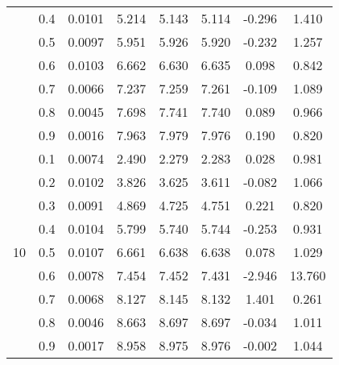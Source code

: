 \documentclass[11pt,a4paper]{report}
\begin{document}
\begin{longtable}{ | c | c || c | c | c | c | c | c | }
 & 0.4 & 0.0101 & 5.214 & 5.143 & 5.114 & -0.296 & 1.410 \\
 & 0.5 & 0.0097 & 5.951 & 5.926 & 5.920 & -0.232 & 1.257 \\
 & 0.6 & 0.0103 & 6.662 & 6.630 & 6.635 & 0.098 & 0.842 \\
 & 0.7 & 0.0066 & 7.237 & 7.259 & 7.261 & -0.109 & 1.089 \\
 & 0.8 & 0.0045 & 7.698 & 7.741 & 7.740 & 0.089 & 0.966 \\
 & 0.9 & 0.0016 & 7.963 & 7.979 & 7.976 & 0.190 & 0.820 \\
 \hline
\multirow{9}{*}{10} & 0.1 & 0.0074 & 2.490 & 2.279 & 2.283 & 0.028 & 0.981 \\
 & 0.2 & 0.0102 & 3.826 & 3.625 & 3.611 & -0.082 & 1.066 \\
 & 0.3 & 0.0091 & 4.869 & 4.725 & 4.751 & 0.221 & 0.820 \\
 & 0.4 & 0.0104 & 5.799 & 5.740 & 5.744 & -0.253 & 0.931 \\
 & 0.5 & 0.0107 & 6.661 & 6.638 & 6.638 & 0.078 & 1.029 \\
 & 0.6 & 0.0078 & 7.454 & 7.452 & 7.431 & -2.946 & 13.760 \\
 & 0.7 & 0.0068 & 8.127 & 8.145 & 8.132 & 1.401 & 0.261 \\
 & 0.8 & 0.0046 & 8.663 & 8.697 & 8.697 & -0.034 & 1.011 \\
 & 0.9 & 0.0017 & 8.958 & 8.975 & 8.976 & -0.002 & 1.044 \\
 \hline
\hline
\end{longtable}
\end{document}
